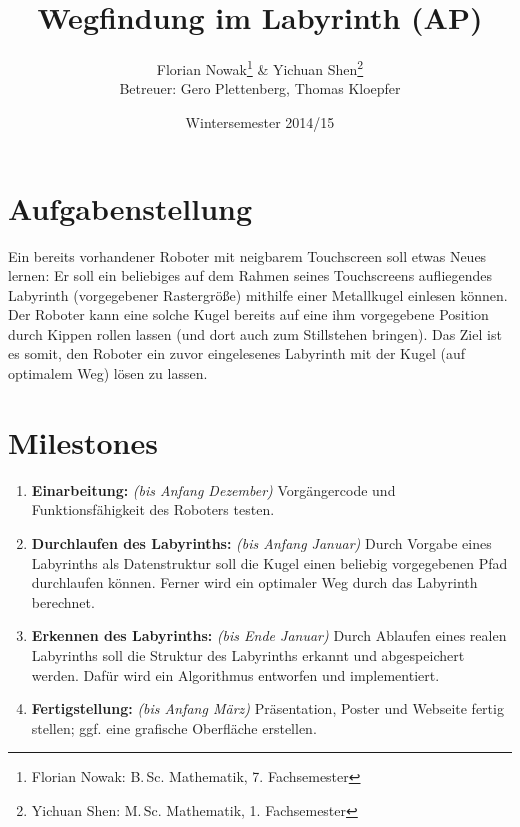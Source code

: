 \documentclass[ngerman]{scrartcl}
\title{Wegfindung im Labyrinth (AP)}
\author{
    Florian Nowak\footnote{Florian Nowak: B.\,Sc. Mathematik, 7. Fachsemester}\; \& Yichuan Shen\footnote{Yichuan Shen: M.\,Sc. Mathematik, 1. Fachsemester}\\
    Betreuer: Gero Plettenberg, Thomas Kloepfer
}
\date{Wintersemester 2014/15}
\begin{document}

\maketitle


\section*{Aufgabenstellung}

Ein bereits vorhandener Roboter mit neigbarem Touchscreen soll etwas Neues lernen: Er soll ein beliebiges auf dem Rahmen seines Touchscreens aufliegendes Labyrinth (vorgegebener Rastergröße) mithilfe einer Metallkugel einlesen können. Der Roboter kann eine solche Kugel bereits auf eine ihm vorgegebene Position durch Kippen rollen lassen (und dort auch zum Stillstehen bringen). Das Ziel ist es somit, den Roboter ein zuvor eingelesenes Labyrinth mit der Kugel (auf optimalem Weg) lösen zu lassen.

\section*{Milestones}
\begin{enumerate}
    \item \textbf{Einarbeitung:} \textit{(bis Anfang Dezember)} Vorgängercode und Funktionsfähigkeit des Roboters testen.
    \item \textbf{Durchlaufen des Labyrinths:} \textit{(bis Anfang Januar)} Durch Vorgabe eines Labyrinths als Datenstruktur soll die Kugel einen beliebig vorgegebenen Pfad durchlaufen können. Ferner wird ein optimaler Weg durch das Labyrinth berechnet.
    \item \textbf{Erkennen des Labyrinths:} \textit{(bis Ende Januar)} Durch Ablaufen eines realen Labyrinths soll die Struktur des Labyrinths erkannt und abgespeichert werden. Dafür wird ein Algorithmus entworfen und implementiert.
    \item \textbf{Fertigstellung:} \textit{(bis Anfang März)} Präsentation, Poster und Webseite fertig stellen; ggf. eine grafische Oberfläche erstellen.
\end{enumerate}
\end{document}
